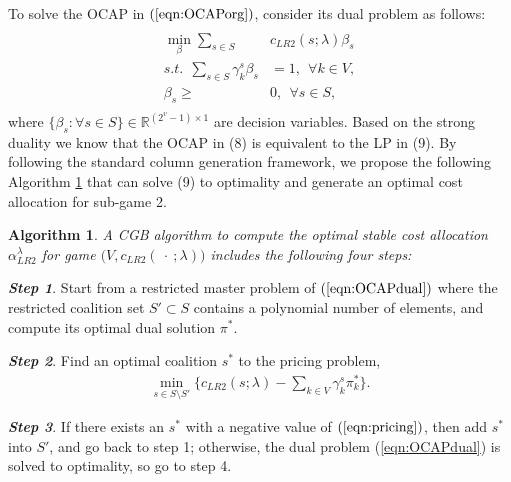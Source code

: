 \documentclass[ijoc,nonblindrev]{informs3} %
\newtheorem{algorithm}{Algorithm}
\newcommand{\R}{\mathbb{R}}
\begin{document}
To solve the OCAP in $(\ref{eqn:OCAPorg})$, consider its dual problem as follows:
\begin{eqnarray}\label{eqn:OCAPdual}
\begin{aligned}
\begin{split}
\min_{\beta} \sum_{s \in S} &c_{LR2}(s;\lambda)\beta_{s}\\
s.t.~~\sum_{s \in S} \gamma^s_k\beta_{s}& = 1,~~\forall k \in V,\\
\beta_{s} \geq &0, ~~\forall s \in S,
\end{split}
\end{aligned}
\end{eqnarray}
where $\{\beta_s:\forall s\in S \} \in \R^{(2^v-1) \times 1}$ are decision variables.
Based on the strong duality we know that the OCAP in (8) is equivalent to the LP in (9). By following the standard column generation framework, we propose the following Algorithm \ref{alg1} that can solve (9) to optimality and generate an optimal cost allocation for sub-game 2.



\begin{algorithm}\label{alg1}
A CGB algorithm to compute the optimal stable cost allocation $\alpha_{LR2}^{\lambda}$ for game $\big(V,c_{LR2}(\ \cdot\ ;\lambda)\big)$ includes  the following four steps:
\end{algorithm}

\textbf{\em Step 1}. Start from a restricted master problem of $(\ref{eqn:OCAPdual})$ where the restricted coalition set $S' \subset S$ contains a polynomial number of elements, and compute its optimal dual solution $\pi^{*}$. %

\textbf{\em Step 2}. Find an optimal coalition $s^*$  to the pricing problem,
\begin{eqnarray}\label{eqn:pricing}
\min_{s\in S\setminus S'}  \big\{c_{LR2}(s;\lambda) - \sum_{ k \in V} \gamma^s_k \pi_{k}^{*}\big\}.
\end{eqnarray}

\textbf{\em Step 3}. If there exists an $s^*$  with a negative value of  $(\ref{eqn:pricing})$, then add $s^*$ into $S'$, and go back to step 1; otherwise, the dual problem (\ref{eqn:OCAPdual}) is solved to optimality, so go to step 4.
\end{document}
